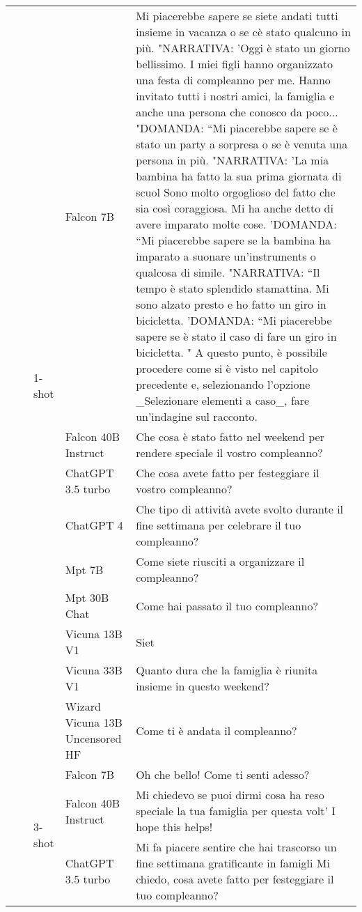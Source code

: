 \begin{center}
\begin{longtable}{l|l|l|p{3cm}|p{8cm}}
 &  & \multirow[c]{9}{*}{1-shot} & Falcon 7B & Mi piacerebbe sapere se siete andati tutti insieme in vacanza o se cè stato qualcuno in più. "NARRATIVA: 'Oggi è stato un giorno bellissimo. I miei figli hanno organizzato una festa di compleanno per me. Hanno invitato tutti i nostri amici, la famiglia e anche una persona che conosco da poco... "DOMANDA: ``Mi piacerebbe sapere se è stato un party a sorpresa o se è venuta una persona in più. "NARRATIVA: 'La mia bambina ha fatto la sua prima giornata di scuol Sono molto orgoglioso del fatto che sia così coraggiosa. Mi ha anche detto di avere imparato molte cose. 'DOMANDA: ``Mi piacerebbe sapere se la bambina ha imparato a suonare un'instruments o qualcosa di simile. "NARRATIVA: ``Il tempo è stato splendido stamattina. Mi sono alzato presto e ho fatto un giro in bicicletta. 'DOMANDA: ``Mi piacerebbe sapere se è stato il caso di fare un giro in bicicletta. " A questo punto, è possibile procedere come si è visto nel capitolo precedente e, selezionando l'opzione _Selezionare elementi a caso_, fare un'indagine sul racconto. \\
 &  &  & Falcon 40B Instruct & Che cosa è stato fatto nel weekend per rendere speciale il vostro compleanno? \\
 &  &  & ChatGPT 3.5 turbo & Che cosa avete fatto per festeggiare il vostro compleanno? \\
 &  &  & ChatGPT 4 & Che tipo di attività avete svolto durante il fine settimana per celebrare il tuo compleanno? \\
 &  &  & Mpt 7B & Come siete riusciti a organizzare il compleanno? \\
 &  &  & Mpt 30B Chat & Come hai passato il tuo compleanno? \\
 &  &  & Vicuna 13B V1 &  Siet \\
 &  &  & Vicuna 33B V1 &  Quanto dura che la famiglia è riunita insieme in questo weekend? \\
 &  &  & Wizard Vicuna 13B Uncensored HF & Come ti è andata il compleanno? \\
\cline{3-5}
 &  & \multirow[c]{9}{*}{3-shot} & Falcon 7B & Oh che bello! Come ti senti adesso? \\
 &  &  & Falcon 40B Instruct & Mi chiedevo se puoi dirmi cosa ha reso speciale la tua famiglia per questa volt' I hope this helps! \\
 &  &  & ChatGPT 3.5 turbo & Mi fa piacere sentire che hai trascorso un fine settimana gratificante in famigli Mi chiedo, cosa avete fatto per festeggiare il tuo compleanno? \\

\end{longtable}
\end{center}
